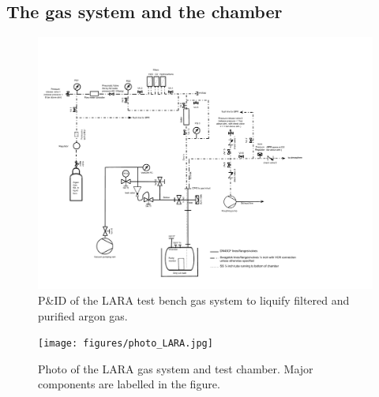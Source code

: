 \documentclass[a4paper,11pt]{article}
\begin{document}
\subsection{The gas system and the chamber}
\begin{figure}
	\begin{center}
	\includegraphics[width=1\textwidth, trim={0 1cm 6cm 2cm}, clip=true]{figures/PnID.pdf}			
	\caption{P\&ID of the LARA test bench gas system to liquify filtered and purified argon gas.}
	\label{fig:PnID}
	\end{center}
\end{figure}

\begin{figure}[tb]
	\begin{center}
	\texttt{[image: figures/photo\_LARA.jpg]}			
	\caption{Photo of the LARA gas system and test chamber. Major components are labelled in the figure.}
	\label{fig:photo_LARA}
	\end{center}
\end{figure}
\end{document}
